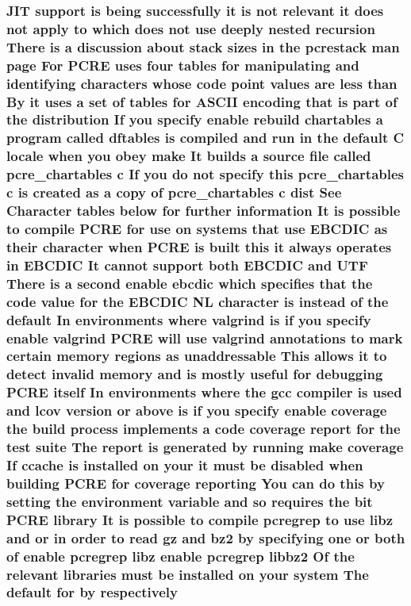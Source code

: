 \subsubsection[{\texorpdfstring{respectively}{respectively}}]{ J\+IT {\bf support} {\bf is} being successfully {\bf it} {\bf is} {\bf not} relevant {\bf it} does {\bf not} apply {\bf to} {\bf which} does {\bf not} use deeply nested {\bf recursion} There {\bf is} {\bf a} discussion about {\bf stack} sizes {\bf in} the pcrestack {\bf man} page For {\bf P\+C\+RE} uses four {\bf tables} for manipulating and identifying {\bf characters} whose {\bf code} {\bf point} {\bf values} {\bf are} less {\bf than} By {\bf it} uses {\bf a} {\bf set} {\bf of} {\bf tables} for {\bf A\+S\+C\+II} {\bf encoding} that {\bf is} part {\bf of} the distribution If you specify enable rebuild {\bf chartables} {\bf a} {\bf program} called {\bf dftables} {\bf is} {\bf compiled} and {\bf run} {\bf in} the {\bf default} {\bf C} {\bf locale} when you obey {\bf make} It builds {\bf a} {\bf source} {\bf file} called pcre\+\_\+chartables {\bf c} If you {\bf do} {\bf not} specify {\bf this} pcre\+\_\+chartables {\bf c} {\bf is} created {\bf as} {\bf a} copy {\bf of} pcre\+\_\+chartables {\bf c} {\bf dist} See Character {\bf tables} {\bf below} for further information It {\bf is} {\bf possible} {\bf to} {\bf compile} {\bf P\+C\+RE} for use {\bf on} {\bf systems} that use E\+B\+C\+D\+IC {\bf as} their {\bf character} when {\bf P\+C\+RE} {\bf is} {\bf built} {\bf this} {\bf it} always operates {\bf in} E\+B\+C\+D\+IC It cannot {\bf support} both E\+B\+C\+D\+IC and U\+TF There {\bf is} {\bf a} {\bf second} enable ebcdic {\bf which} specifies that the {\bf code} {\bf value} for the E\+B\+C\+D\+IC {\bf NL} {\bf character} {\bf is} instead {\bf of} the {\bf default} In {\bf environments} {\bf where} valgrind {\bf is} {\bf if} you specify enable valgrind {\bf P\+C\+RE} will use valgrind annotations {\bf to} {\bf mark} certain {\bf memory} regions {\bf as} unaddressable This allows {\bf it} {\bf to} detect invalid {\bf memory} and {\bf is} mostly useful for debugging {\bf P\+C\+RE} {\bf itself} In {\bf environments} {\bf where} the {\bf gcc} {\bf compiler} {\bf is} {\bf used} and lcov version {\bf or} {\bf above} {\bf is} {\bf if} you specify enable coverage the build {\bf process} implements {\bf a} {\bf code} coverage report for the test suite The report {\bf is} {\bf generated} by running {\bf make} coverage If ccache {\bf is} {\bf installed} {\bf on} your {\bf it} must {\bf be} disabled when building {\bf P\+C\+RE} for coverage reporting You {\bf can} {\bf do} {\bf this} by {\bf setting} the {\bf environment} variable and {\bf so} requires the {\bf bit} {\bf P\+C\+RE} {\bf library} It {\bf is} {\bf possible} {\bf to} {\bf compile} pcregrep {\bf to} use libz and {\bf or} {\bf in} {\bf order} {\bf to} {\bf read} gz and {\bf bz2} by {\bf specifying} one {\bf or} both {\bf of} enable pcregrep libz enable pcregrep {\bf libbz2} Of the relevant {\bf libraries} must {\bf be} {\bf installed} {\bf on} your {\bf system} The {\bf default} for by respectively}\hypertarget{README_8txt_a407dda62476b099b1018d9976b129de4}{}\label{README_8txt_a407dda62476b099b1018d9976b129de4}
